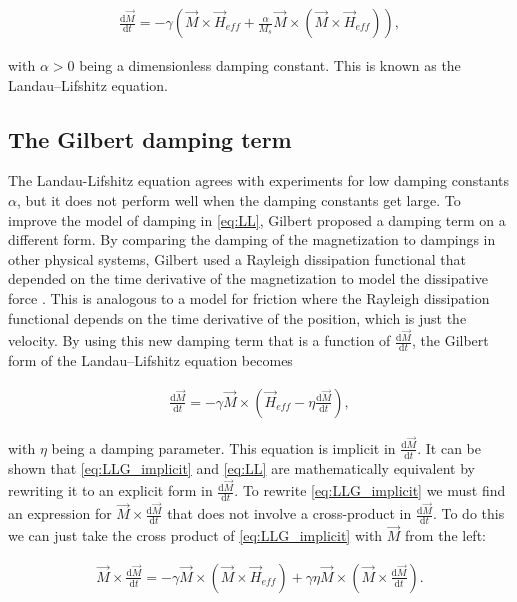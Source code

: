 \documentclass[1p]{elsarticle}		%
\numberwithin{equation}{section}
\begin{document}
\begin{align}
\label{eq:LL}
\frac{\textrm{d} \vec{M}}{\textrm{d} t} = -\gamma (\vec{M} \times \vec{H}_{eff} + \frac{\alpha}{M_s} \vec{M}\times(\vec{M}\times\vec{H}_{eff})),
\end{align}

with $\alpha > 0$ being a dimensionless damping constant. This is known as the Landau--Lifshitz equation.

\subsection{The Gilbert damping term}
The Landau-Lifshitz equation agrees with experiments for low damping constants $\alpha$, but it does not perform well when the damping constants get large. To improve the model of damping in \eqref{eq:LL}, Gilbert proposed a damping term on a different form. By comparing the damping of the magnetization to dampings in other physical systems, Gilbert used a Rayleigh dissipation functional that depended on the time derivative of the magnetization to model the dissipative force \cite{Gilbert2004Classics}. This is analogous to a model for friction where the Rayleigh dissipation functional depends on the time derivative of the position, which is just the velocity. By using this new damping term that is a function of $\frac{\textrm{d} \vec{M}}{\textrm{d} t}$, the Gilbert form of the Landau--Lifshitz equation becomes

\begin{align}
\label{eq:LLG_implicit}
\frac{\textrm{d} \vec{M}}{\textrm{d} t} = -\gamma \vec{M} \times (\vec{H}_{eff} - \eta \frac{\textrm{d} \vec{M}}{\textrm{d} t}),
\end{align}

with $\eta$ being a damping parameter. This equation is implicit in $\frac{\textrm{d} \vec{M}}{\textrm{d} t}$. It can be shown that \eqref{eq:LLG_implicit} and \eqref{eq:LL} are mathematically equivalent by rewriting it to an explicit form in $\frac{\textrm{d} \vec{M}}{\textrm{d} t}$. To rewrite \eqref{eq:LLG_implicit} we must find an expression for $\vec{M}\times\frac{\textrm{d} \vec{M}}{\textrm{d} t}$ that does not involve a cross-product in $\frac{\textrm{d} \vec{M}}{\textrm{d} t}$. To do this we can just take the cross product of \eqref{eq:LLG_implicit} with $\vec{M}$ from the left:

\begin{align}
\label{eq:mtimesdmdt}
\vec{M}\times\frac{\textrm{d} \vec{M}}{\textrm{d} t} = -\gamma \vec{M}\times(\vec{M}\times\vec{H}_{eff}) + \gamma\eta \vec{M}\times(\vec{M}\times\frac{\textrm{d} \vec{M}}{\textrm{d} t}).
\end{align}
\end{document}
